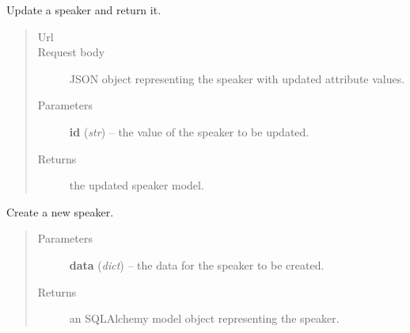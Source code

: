 \documentclass[letterpaper,10pt,english]{sphinxmanual}
\begin{document}
\begin{fulllineitems}
\begin{fulllineitems}
\begin{quote}
\begin{description}
\end{description}\end{quote}

\end{fulllineitems}


\begin{fulllineitems}
\label{api:onlinelinguisticdatabase.controllers.speakers.SpeakersController.update}
Update a speaker and return it.
\begin{quote}\begin{description}
\item[{Url }] \leavevmode
{}

\item[{Request body}] \leavevmode
JSON object representing the speaker with updated attribute values.

\item[{Parameters}] \leavevmode
\textbf{id} (\emph{str}) -- the  value of the speaker to be updated.

\item[{Returns}] \leavevmode
the updated speaker model.

\end{description}\end{quote}

\end{fulllineitems}


\end{fulllineitems}


\begin{fulllineitems}
\label{api:onlinelinguisticdatabase.controllers.speakers.createNewSpeaker}
Create a new speaker.
\begin{quote}\begin{description}
\item[{Parameters}] \leavevmode
\textbf{data} (\emph{dict}) -- the data for the speaker to be created.

\item[{Returns}] \leavevmode
an SQLAlchemy model object representing the speaker.

\end{description}\end{quote}

\end{fulllineitems}
\end{document}
